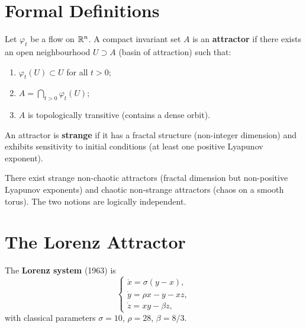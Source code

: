 \section{Formal Definitions}

\begin{definition}[Attractor]
Let $\varphi_t$ be a flow on $\mathbb{R}^n$. A compact invariant set $A$ is an
\textbf{attractor} if there exists an open neighbourhood $U \supset A$
(basin of attraction) such that:
\begin{enumerate}
    \item $\varphi_t(U) \subset U$ for all $t > 0$;
    \item $A = \bigcap_{t > 0} \varphi_t(U)$;
    \item $A$ is topologically transitive (contains a dense orbit).
\end{enumerate}
\end{definition}

\begin{definition}
An attractor is \textbf{strange} if it has a fractal structure (non-integer
dimension) and exhibits sensitivity to initial conditions (at least one
positive Lyapunov exponent).
\end{definition}

\begin{attention}[title=\textbf{Strange $\neq$ chaotic}]
There exist strange non-chaotic attractors (fractal dimension but non-positive
Lyapunov exponents) and chaotic non-strange attractors (chaos on a smooth
torus). The two notions are logically independent.
\end{attention}

\section{The Lorenz Attractor}

\begin{definition}
The \textbf{Lorenz system} (1963) is
\[
    \begin{cases}
    \dot{x} = \sigma(y - x), \\
    \dot{y} = \rho x - y - xz, \\
    \dot{z} = xy - \beta z,
    \end{cases}
\]
with classical parameters $\sigma = 10$, $\rho = 28$, $\beta = 8/3$.
\end{definition}

